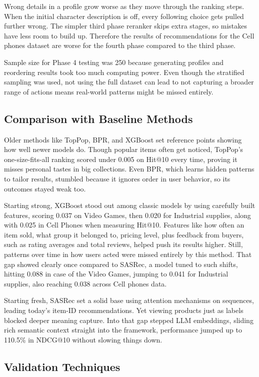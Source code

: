 \documentclass[conference]{IEEEtran}
\begin{document}
Wrong details in a profile grow worse as they move through the ranking steps. When the initial character description is off, every following choice gets pulled further wrong. The simpler third phase reranker skips extra stages, so mistakes have less room to build up. Therefore the results of recommendations for the Cell phones dataset are worse for the fourth phase compared to the third phase.

Sample size for Phase 4 testing was 250 because generating profiles and reordering results took too much computing power. Even though the stratified sampling was used, not using the full dataset can lead to not capturing a broader range of actions means real-world patterns might be missed entirely. 

\subsection{Comparison with Baseline Methods}
Older methods like TopPop, BPR, and XGBoost set reference points showing how well newer models do. Though popular items often get noticed, TopPop’s one-size-fits-all ranking scored under 0.005 on Hit@10 every time, proving it misses personal tastes in big collections. Even BPR, which learns hidden patterns to tailor results, stumbled because it ignores order in user behavior, so its outcomes stayed weak too.

Starting strong, XGBoost stood out among classic models by using carefully built features, scoring 0.037 on Video Games, then 0.020 for Industrial supplies, along with 0.025 in Cell Phones when measuring Hit@10. Features like how often an item sold, what group it belonged to, pricing level, plus feedback from buyers, such as rating averages and total reviews, helped push its results higher. Still, patterns over time in how users acted were missed entirely by this method. That gap showed clearly once compared to SASRec, a model tuned to such shifts, hitting 0.088 in case of the Video Games, jumping to 0.041 for  Industrial supplies, also reaching 0.038 across Cell phones data.

Starting fresh, SASRec set a solid base using attention mechanisms on sequences, leading today's item-ID recommendations. Yet viewing products just as labels blocked deeper meaning capture. Into that gap stepped LLM embeddings, sliding rich semantic context straight into the framework, performance jumped up to 110.5\% in NDCG@10 without slowing things down.

\subsection{Validation Techniques}
\end{document}

